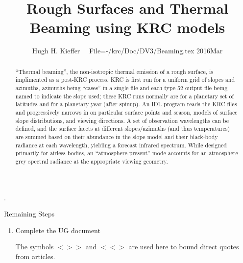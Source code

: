 \documentclass{article}
\title{Rough Surfaces and Thermal Beaming using KRC models}
\author{Hugh H. Kieffer  \ \ File=-/krc/Doc/DV3/Beaming.tex  2016Mar}
\newcommand{\bq}{$ < \! > \!   \! >$ } %
\newcommand{\eq}{ $< \! \! < \! > $ } %
\begin{document}
\maketitle
\tableofcontents
\listoffigures
\hrulefill .\hrulefill

\begin{abstract}
``Thermal beaming'', the non-isotropic thermal emission of a rough surface, is
  implimented as a post-KRC process.  KRC is first run for a uniform grid of
  slopes and azimuths, azimuths being ``cases'' in a single file and each type
  52 output file being named to indicate the slope used; these KRC runs normally
  are for a planetary set of latitudes and for a planetary year (after
  spinup). An IDL program reads the KRC files and progressively narrows in on
  particular surface points and season, models of surface slope distributions,
  and viewing directions. A set of observation wavelengths can be defined, and
  the surface facets at different slopes/azimuths (and thus temperatures) are
  summed based on their abundance in the slope model and their black-body
  radiance at each wavelength, yielding a forecast infrared spectrum. While
  designed primarily for airless bodies, an ``atmosphere-present'' mode accounts
  for an atmosphere grey spectral radiance at the appropriate viewing geometry.
\end{abstract}

Remaining Steps \begin{enumerate}    %
 \item Complete the UG document

The symbols \bq and \eq  are used here to bound direct quotes from articles.

\end{enumerate}

\end{document}
